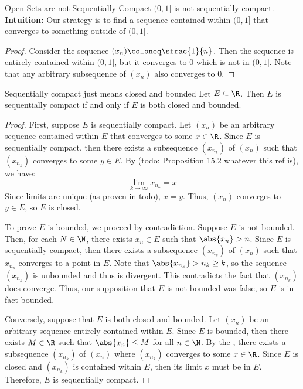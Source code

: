 \begin{exbox}{Open Sets are not Sequentially Compact}{}
    $(0,1]$ is not sequentially compact.
    \tcblower
    \textbf{Intuition:} Our strategy is to find a sequence contained within $(0,1]$ that converges to something outside of $(0,1]$.
    \begin{proof}
        Consider the sequence $(x_n) \coloneq \sfrac{1}{n}$. Then the sequence is entirely contained within $(0,1]$, but it converges to $0$ which is not in $(0,1]$. Note that any arbitrary subsequence of $(x_n)$ also converges to $0$. 
    \end{proof}
\end{exbox}

\begin{thmbox}{Sequentially compact just means closed and bounded}{}
    Let $E \subseteq \R$. Then $E$ is sequentially compact if and only if $E$ is both closed and bounded.
    \tcblower
    \begin{proof}
        First, suppose $E$ is sequentially compact. Let $(x_n)$ be an arbitrary sequence contained within $E$ that converges to some $x \in \R$. Since $E$ is sequentially compact, then there exists a subsequence $(x_{n_k})$ of $(x_n)$ such that $(x_{n_k})$ converges to some $y \in E$. By (todo: Proposition 15.2 whatever this ref is), we have:
        \[ \lim_{k \to \infty} x_{n_k} = x \]
        Since limits are unique (as proven in todo), $x = y$. Thus, $(x_n)$ converges to $y \in E$, so $E$ is closed.

        To prove $E$ is bounded, we proceed by contradiction. Suppose $E$ is not bounded. Then, for each $N \in \N$, there exists $x_n \in E$ such that $\abs{x_n} > n$. Since $E$ is sequentially compact, then there exists a subsequence $(x_{n_k})$ of $(x_n)$ such that $x_{n_k}$ converges to a point in $E$. Note that $\abs{x_{n_k}} > n_k \geq k$, so the sequence $(x_{n_k})$ is unbounded and thus is divergent. This contradicts the fact that $(x_{n_k})$ does converge. Thus, our supposition that $E$ is not bounded was false, so $E$ is in fact bounded.

        Conversely, suppose that $E$ is both closed and bounded. Let $(x_n)$ be an arbitrary sequence entirely contained within $E$. Since $E$ is bounded, then there exists $M \in \R$ such that $\abs{x_n} \leq M$ for all $n \in \N$. By the , there exists a subsequence $(x_{n_k})$ of $(x_n)$ where $(x_{n_k})$ converges to some $x \in \R$. Since $E$ is closed and $(x_{n_k})$ is contained within $E$, then its limit $x$ must be in $E$. Therefore, $E$ is sequentially compact.
    \end{proof}
\end{thmbox}

